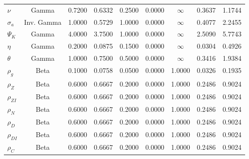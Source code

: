 \begin{center}
\begin{longtable}{lcccccccc}
$ \nu $ & Gamma & 0.7200 & 0.6332 & 0.2500 & 0.0000 & $\infty$ & 0.3637 & 1.1744 \\ 
$ {\sigma_a} $ & Inv. Gamma & 1.0000 & 0.5729 & 1.0000 & 0.0000 & $\infty$ & 0.4077 & 2.2455 \\ 
$ {\Psi_K} $ & Gamma & 4.0000 & 3.7500 & 1.0000 & 0.0000 & $\infty$ & 2.5090 & 5.7743 \\ 
$ {\eta} $ & Gamma & 0.2000 & 0.0875 & 0.1500 & 0.0000 & $\infty$ & 0.0304 & 0.4926 \\ 
$ {\theta} $ & Gamma & 1.0000 & 0.7500 & 0.5000 & 0.0000 & $\infty$ & 0.3416 & 1.9384 \\ 
$ {\rho_g} $ & Beta & 0.1000 & 0.0758 & 0.0500 & 0.0000 & 1.0000 & 0.0326 & 0.1935 \\ 
$ {\rho_Z} $ & Beta & 0.6000 & 0.6667 & 0.2000 & 0.0000 & 1.0000 & 0.2486 & 0.9024 \\ 
$ {\rho_{ZI}} $ & Beta & 0.6000 & 0.6667 & 0.2000 & 0.0000 & 1.0000 & 0.2486 & 0.9024 \\ 
$ {\rho_N} $ & Beta & 0.6000 & 0.6667 & 0.2000 & 0.0000 & 1.0000 & 0.2486 & 0.9024 \\ 
$ {\rho_D} $ & Beta & 0.6000 & 0.6667 & 0.2000 & 0.0000 & 1.0000 & 0.2486 & 0.9024 \\ 
$ {\rho_{DI}} $ & Beta & 0.6000 & 0.6667 & 0.2000 & 0.0000 & 1.0000 & 0.2486 & 0.9024 \\ 
$ {\rho_C} $ & Beta & 0.6000 & 0.6667 & 0.2000 & 0.0000 & 1.0000 & 0.2486 & 0.9024 \\ 
\end{longtable}
 \end{center}
